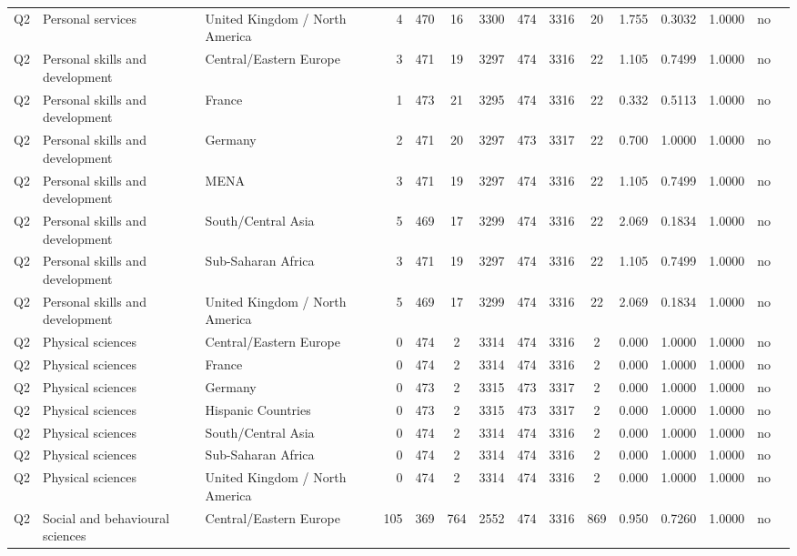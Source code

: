 \begin{longtable}{lllrcccccccccll}
Q2 & Personal services & United Kingdom / North America & 4 & 470 & 16 & 3300 & 474 & 3316 & 20 & 1.755 & 0.3032 & 1.0000 & no \\
Q2 & Personal skills and development & Central/Eastern Europe & 3 & 471 & 19 & 3297 & 474 & 3316 & 22 & 1.105 & 0.7499 & 1.0000 & no \\
Q2 & Personal skills and development & France & 1 & 473 & 21 & 3295 & 474 & 3316 & 22 & 0.332 & 0.5113 & 1.0000 & no \\
Q2 & Personal skills and development & Germany & 2 & 471 & 20 & 3297 & 473 & 3317 & 22 & 0.700 & 1.0000 & 1.0000 & no \\
Q2 & Personal skills and development & MENA & 3 & 471 & 19 & 3297 & 474 & 3316 & 22 & 1.105 & 0.7499 & 1.0000 & no \\
Q2 & Personal skills and development & South/Central Asia & 5 & 469 & 17 & 3299 & 474 & 3316 & 22 & 2.069 & 0.1834 & 1.0000 & no \\
Q2 & Personal skills and development & Sub-Saharan Africa & 3 & 471 & 19 & 3297 & 474 & 3316 & 22 & 1.105 & 0.7499 & 1.0000 & no \\
Q2 & Personal skills and development & United Kingdom / North America & 5 & 469 & 17 & 3299 & 474 & 3316 & 22 & 2.069 & 0.1834 & 1.0000 & no \\
Q2 & Physical sciences & Central/Eastern Europe & 0 & 474 & 2 & 3314 & 474 & 3316 & 2 & 0.000 & 1.0000 & 1.0000 & no \\
Q2 & Physical sciences & France & 0 & 474 & 2 & 3314 & 474 & 3316 & 2 & 0.000 & 1.0000 & 1.0000 & no \\
Q2 & Physical sciences & Germany & 0 & 473 & 2 & 3315 & 473 & 3317 & 2 & 0.000 & 1.0000 & 1.0000 & no \\
Q2 & Physical sciences & Hispanic Countries & 0 & 473 & 2 & 3315 & 473 & 3317 & 2 & 0.000 & 1.0000 & 1.0000 & no \\
Q2 & Physical sciences & South/Central Asia & 0 & 474 & 2 & 3314 & 474 & 3316 & 2 & 0.000 & 1.0000 & 1.0000 & no \\
Q2 & Physical sciences & Sub-Saharan Africa & 0 & 474 & 2 & 3314 & 474 & 3316 & 2 & 0.000 & 1.0000 & 1.0000 & no \\
Q2 & Physical sciences & United Kingdom / North America & 0 & 474 & 2 & 3314 & 474 & 3316 & 2 & 0.000 & 1.0000 & 1.0000 & no \\
Q2 & Social and behavioural sciences & Central/Eastern Europe & 105 & 369 & 764 & 2552 & 474 & 3316 & 869 & 0.950 & 0.7260 & 1.0000 & no \\

\end{longtable}
